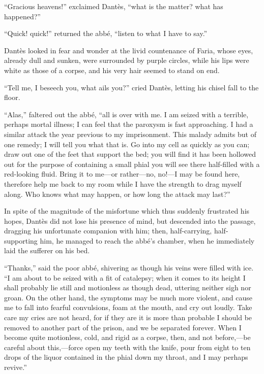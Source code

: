 “Gracious heavens!” exclaimed Dantès, “what is the matter? what has
happened?”

“Quick! quick!” returned the abbé, “listen to what I have to say.”

Dantès looked in fear and wonder at the livid countenance of Faria,
whose eyes, already dull and sunken, were surrounded by purple circles,
while his lips were white as those of a corpse, and his very hair
seemed to stand on end.

“Tell me, I beseech you, what ails you?” cried Dantès, letting his
chisel fall to the floor.

“Alas,” faltered out the abbé, “all is over with me. I am seized with a
terrible, perhaps mortal illness; I can feel that the paroxysm is fast
approaching. I had a similar attack the year previous to my
imprisonment. This malady admits but of one remedy; I will tell you
what that is. Go into my cell as quickly as you can; draw out one of
the feet that support the bed; you will find it has been hollowed out
for the purpose of containing a small phial you will see there
half-filled with a red-looking fluid. Bring it to me—or rather—no,
no!—I may be found here, therefore help me back to my room while I have
the strength to drag myself along. Who knows what may happen, or how
long the attack may last?”

In spite of the magnitude of the misfortune which thus suddenly
frustrated his hopes, Dantès did not lose his presence of mind, but
descended into the passage, dragging his unfortunate companion with
him; then, half-carrying, half-supporting him, he managed to reach the
abbé’s chamber, when he immediately laid the sufferer on his bed.

“Thanks,” said the poor abbé, shivering as though his veins were filled
with ice. “I am about to be seized with a fit of catalepsy; when it
comes to its height I shall probably lie still and motionless as though
dead, uttering neither sigh nor groan. On the other hand, the symptoms
may be much more violent, and cause me to fall into fearful
convulsions, foam at the mouth, and cry out loudly. Take care my cries
are not heard, for if they are it is more than probable I should be
removed to another part of the prison, and we be separated forever.
When I become quite motionless, cold, and rigid as a corpse, then, and
not before,—be careful about this,—force open my teeth with the knife,
pour from eight to ten drops of the liquor contained in the phial down
my throat, and I may perhaps revive.”


